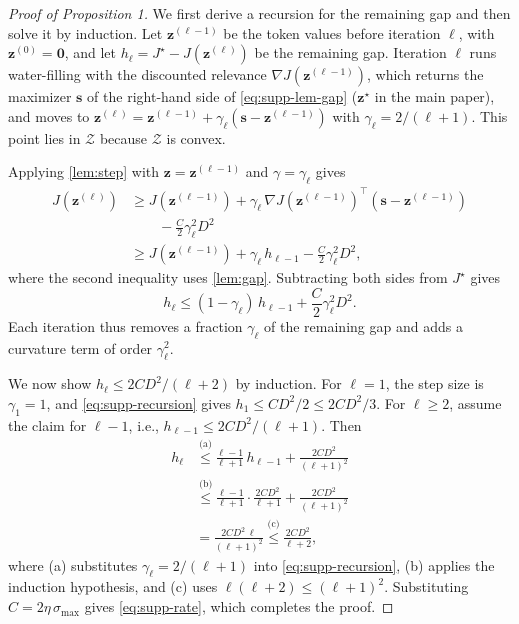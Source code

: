 \begin{proof}[Proof of Proposition 1]
We first derive a recursion for the remaining gap and then solve it by induction. Let $\mathbf z^{(\ell-1)}$ be the token values before iteration $\ell$, with $\mathbf z^{(0)}=\mathbf 0$, and let $h_\ell=J^\star-J(\mathbf z^{(\ell)})$ be the remaining gap. Iteration $\ell$ runs water-filling with the discounted relevance $\nabla J(\mathbf z^{(\ell-1)})$, which returns the maximizer $\mathbf s$ of the right-hand side of \cref{eq:supp-lem-gap} ($\mathbf z^\star$ in the main paper), and moves to $\mathbf z^{(\ell)}=\mathbf z^{(\ell-1)}+\gamma_\ell(\mathbf s-\mathbf z^{(\ell-1)})$ with $\gamma_\ell=2/(\ell+1)$. This point lies in $\mathcal Z$ because $\mathcal Z$ is convex.

Applying \cref{lem:step} with $\mathbf z=\mathbf z^{(\ell-1)}$ and $\gamma=\gamma_\ell$ gives
\begin{align*}
  J(\mathbf z^{(\ell)})
  &\ge J(\mathbf z^{(\ell-1)})+\gamma_\ell\,\nabla J(\mathbf z^{(\ell-1)})^{\top}(\mathbf s-\mathbf z^{(\ell-1)})\\
  &\qquad-\frac{C}{2}\gamma_\ell^2D^2\\
  &\ge J(\mathbf z^{(\ell-1)})+\gamma_\ell\,h_{\ell-1}-\frac{C}{2}\gamma_\ell^2D^2 ,
\end{align*}
where the second inequality uses \cref{lem:gap}. Subtracting both sides from $J^\star$ gives
\begin{equation}
  h_\ell\le(1-\gamma_\ell)\,h_{\ell-1}+\frac{C}{2}\gamma_\ell^2D^2 .
\label{eq:supp-recursion}
\end{equation}
Each iteration thus removes a fraction $\gamma_\ell$ of the remaining gap and adds a curvature term of order $\gamma_\ell^2$.

We now show $h_\ell\le2CD^2/(\ell+2)$ by induction. For $\ell=1$, the step size is $\gamma_1=1$, and \cref{eq:supp-recursion} gives $h_1\le CD^2/2\le2CD^2/3$. For $\ell\ge2$, assume the claim for $\ell-1$, i.e., $h_{\ell-1}\le2CD^2/(\ell+1)$. Then
\begin{align*}
  h_\ell&\overset{\text{(a)}}{\le}\frac{\ell-1}{\ell+1}\,h_{\ell-1}+\frac{2CD^2}{(\ell+1)^2}\\
  &\overset{\text{(b)}}{\le}\frac{\ell-1}{\ell+1}\cdot\frac{2CD^2}{\ell+1}+\frac{2CD^2}{(\ell+1)^2}\\
  &=\frac{2CD^2\,\ell}{(\ell+1)^2}\overset{\text{(c)}}{\le}\frac{2CD^2}{\ell+2} ,
\end{align*}
where (a) substitutes $\gamma_\ell=2/(\ell+1)$ into \cref{eq:supp-recursion}, (b) applies the induction hypothesis, and (c) uses $\ell(\ell+2)\le(\ell+1)^2$. Substituting $C=2\eta\,\sigma_{\max}$ gives \cref{eq:supp-rate}, which completes the proof.
\end{proof}

